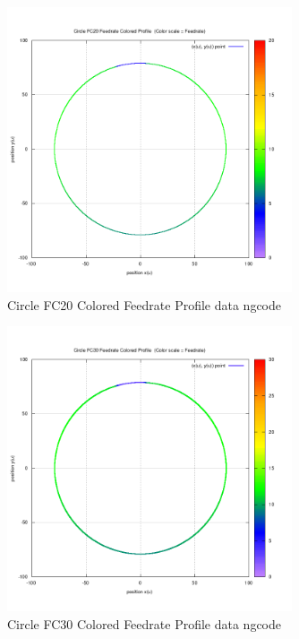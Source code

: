 \begin{figure}
	\caption     {Circle FC20 Colored Feedrate Profile data ngcode}
	\label{18-img-Circle-FC20-Colored-Feedrate-Profile-data_ngcode.png}
	\includegraphics[width=0.75\textwidth]{Chap4/appendix/app-Circle/plots/18-img-Circle-FC20-Colored-Feedrate-Profile-data_ngcode.png}
\end{figure}

\clearpage
\pagebreak

\begin{figure}
	\caption     {Circle FC30 Colored Feedrate Profile data ngcode}
	\label{19-img-Circle-FC30-Colored-Feedrate-Profile-data_ngcode.png}
	\includegraphics[width=0.75\textwidth]{Chap4/appendix/app-Circle/plots/19-img-Circle-FC30-Colored-Feedrate-Profile-data_ngcode.png}
\end{figure}


